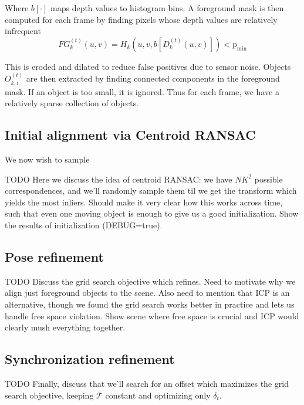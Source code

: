 \documentclass[letterpaper, 10 pt, conference]{ieeeconf}  %
\begin{document}
Where $b[\cdot]$ maps depth values to histogram bins. A foreground mask is then computed for each frame by finding pixels whose depth values are relatively infrequent
\begin{equation*}
  FG_k^{(t)}(u,v) = H_{k}(u, v, b[D_{k}^{(t)}(u,v)]) < \text{p}_\text{min}
\end{equation*}

This is eroded and dilated to reduce false positives due to sensor noise. Objects $O_{k,i}^{(t)}$ are then extracted by finding connected components in the foreground mask. 
If an object is too small, it is ignored. Thus for each frame, we have a relatively sparse collection of objects.

\subsection{Initial alignment via Centroid RANSAC}

We now wish to sample 


TODO Here we discuss the idea of centroid RANSAC: we have $NK^2$ possible correspondences, and we'll randomly sample
them til we get the transform which yields the most inliers. Should make it very clear how this works across 
time, such that even one moving object is enough to give us a good initialization. Show the results of 
initialization (DEBUG=true).

\subsection{Pose refinement}
TODO Discuss the grid search objective which refines. Need to motivate why we align just foreground objects to the scene. 
Also need to mention that ICP is an alternative, though we found the grid search works better in practice and lets 
us handle free space violation. Show scene where free space is crucial and ICP would clearly mush everything 
together.

\subsection{Synchronization refinement}
TODO Finally, discuss that we'll search for an offset which maximizes the grid search objective, keeping $\mathcal{T}$ 
constant and optimizing only $\delta_t$. 
\end{document}
